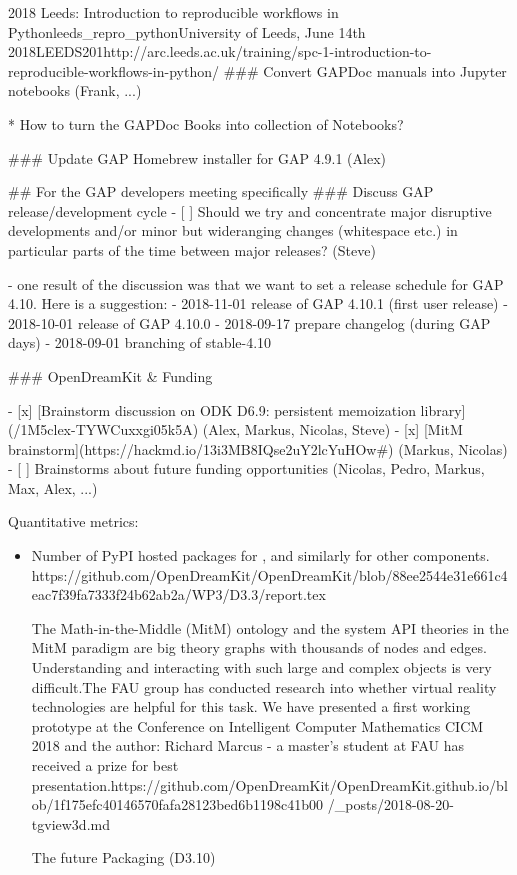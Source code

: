 \begin{Aim 1}
\begin{Aim 2}
\begin{event}{2018 Leeds: Introduction to reproducible workflows in Python}{leeds_repro_python}{University of Leeds, June 14th 2018}{LEEDS}{20}{1}{http://arc.leeds.ac.uk/training/spc-1-introduction-to-reproducible-workflows-in-python/}
### Convert GAPDoc manuals into Jupyter notebooks (Frank, ...)

* How to turn the GAPDoc Books into collection of Notebooks?

### Update GAP Homebrew installer for GAP 4.9.1 (Alex)

## For the GAP developers meeting specifically
### Discuss GAP release/development cycle 
- [ ] Should we try and concentrate major disruptive developments and/or minor but wideranging changes (whitespace etc.) in particular parts of the time between major releases? (Steve)

- one result of the discussion was that we want to set a release schedule for GAP 4.10. Here is a suggestion:
  - 2018-11-01 release of GAP 4.10.1 (first user release)
  - 2018-10-01 release of GAP 4.10.0
  - 2018-09-17 prepare changelog (during GAP days)
  - 2018-09-01 branching of stable-4.10

### OpenDreamKit & Funding

- [x] [Brainstorm discussion on ODK D6.9: persistent memoization library](/1M5clex-TYWCuxxgi05k5A) (Alex, Markus, Nicolas, Steve)
- [x] [MitM brainstorm](https://hackmd.io/13i3MB8IQse2uY2lcYuHOw#) (Markus, Nicolas)
- [ ] Brainstorms about future funding opportunities (Nicolas, Pedro, Markus, Max, Alex, ...)




Quantitative metrics:
\begin{itemize}
\item Number of PyPI hosted packages for \Sage, and similarly for
  other components.
  https://github.com/OpenDreamKit/OpenDreamKit/blob/88ee2544e31e661c4eac7f39fa7333f24b62ab2a/WP3/D3.3/report.tex
  
         The Math-in-the-Middle (MitM) ontology and the system API theories in the MitM paradigm are big theory graphs with thousands of 
         nodes and edges. Understanding and interacting with such large and complex objects is very difficult.The FAU group has conducted
       research into whether virtual reality technologies are helpful for this task. We have presented a first working prototype at the
       Conference on Intelligent Computer Mathematics CICM 2018 and the author: Richard Marcus - a master's student at FAU has received a
       prize for best presentation.https://github.com/OpenDreamKit/OpenDreamKit.github.io/blob/1f175efc40146570fafa28123bed6b1198c41b00
       /_posts/2018-08-20-tgview3d.md
  
    
  The future
         Packaging (D3.10)


\end{itemize}
\end{event}
\end{Aim 2}
\end{Aim 1}
